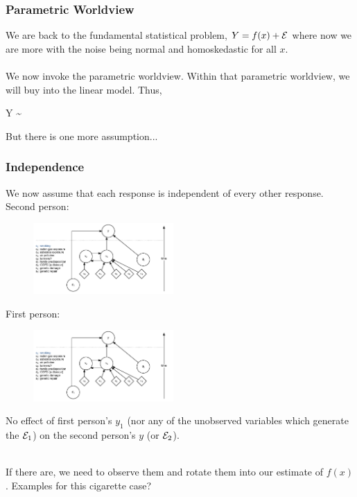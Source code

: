 \documentclass[handout]{beamer}
\begin{document}
\begin{frame}\frametitle{Parametric Worldview}

We are back to the fundamental statistical problem, $Y = f(x) + \mathcal{E}$ where now we are more  with the noise being normal and homoskedastic for all $x$.\\~\\

We now invoke the parametric worldview. Within that parametric worldview, we will buy into the linear model. Thus,

\beqn
Y \sim {}
\eeqn

But there is one more assumption...
	
\end{frame}

\begin{frame}\frametitle{Independence}

We now assume that each response is independent of every other response. \footnotesize Second person:

\begin{minipage}{0.55\textwidth}

\begin{figure}
\centering
\includegraphics[width=2.1in]{cigarettes}
\end{figure}
First person:
\begin{figure}
\centering
\includegraphics[width=2.1in]{cigarettes}
\end{figure}
\end{minipage}
\begin{minipage}{0.35\textwidth}
\normalsize
No effect of first person's $y_1$ (nor any of the unobserved variables which generate the $\mathcal{E}_1$) on the second person's $y$ (or $\mathcal{E}_2$). \\~\\ \pause

If there are, we need to observe them and rotate them into our estimate of $f(x)$. Examples for this cigarette case?
\end{minipage}

\end{frame}
\end{document}
